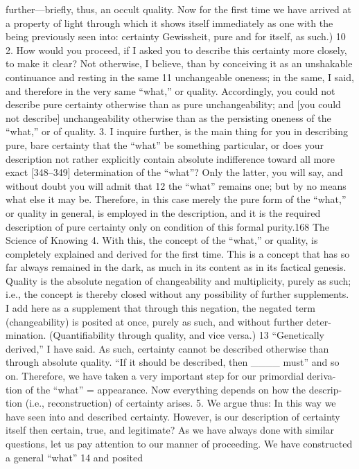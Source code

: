 further—briefly, thus, an occult quality. Now for the first time we have
arrived at a property of light through which it shows itself immediately as
one with the being previously seen into: certainty {Gewissheit}, pure and for
itself, as such.) 10
2. How would you proceed, if I asked you to describe this certainty more
closely, to make it clear? Not otherwise, I believe, than by conceiving it as an
unshakable continuance and resting in the same 11 unchangeable oneness; in the
same, I said, and therefore in the very same “what,” or quality. Accordingly,
you could not describe pure certainty otherwise than as pure unchangeability;
and [you could not describe] unchangeability otherwise than as the persisting
oneness of the “what,” or of quality.
3. I inquire further, is the main thing for you in describing pure, bare
certainty that the “what” be something particular, or does your description not
rather explicitly contain absolute indifference toward all more exact [348–349]
determination of the “what”? Only the latter, you will say, and without doubt
you will admit that 12 the “what” remains one; but by no means what else it may
be. Therefore, in this case merely the pure form of the “what,” or quality in
general, is employed in the description, and it is the required description of
pure certainty only on condition of this formal purity.168
The Science of Knowing
4. With this, the concept of the “what,” or quality, is completely
explained and derived for the first time. This is a concept that has so far always
remained in the dark, as much in its content as in its factical genesis. Quality
is the absolute negation of changeability and multiplicity, purely as such; i.e.,
the concept is thereby closed without any possibility of further supplements.
I add here as a supplement that through this negation, the negated term
(changeability) is posited at once, purely as such, and without further deter-
mination. (Quantifiability through quality, and vice versa.) 13 “Genetically
derived,” I have said. As such, certainty cannot be described otherwise than
through absolute quality. “If it should be described, then ____ must” and so
on. Therefore, we have taken a very important step for our primordial deriva-
tion of the “what” = appearance. Now everything depends on how the descrip-
tion (i.e., reconstruction) of certainty arises.
5. We argue thus: In this way we have seen into and described certainty.
However, is our description of certainty itself then certain, true, and legitimate?
As we have always done with similar questions, let us pay attention to
our manner of proceeding. We have constructed a general “what” 14 and posited

